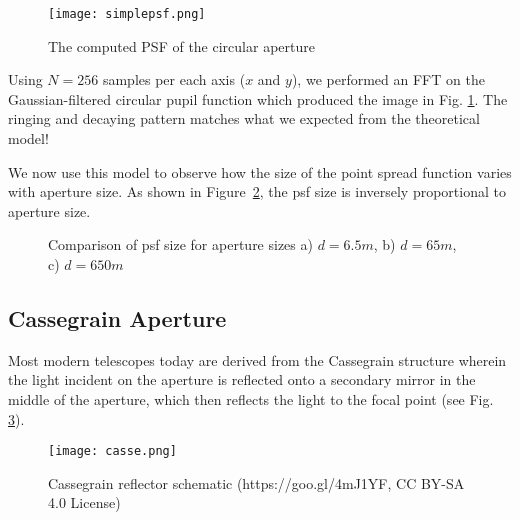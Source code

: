 \documentclass[%
 reprint,
 amsmath,amssymb,
 aps,
 pra,
]{revtex4-1}
\begin{document}
{\begin{figure}[!ht]
  \centering
    \texttt{[image: simplepsf.png]}
  \caption{The computed PSF of the circular aperture}
  \label{fig:simplepsf}
\end{figure}

Using $N=256$ samples per each axis ($x$ and $y$), we performed an FFT on the Gaussian-filtered circular pupil function which produced the image in Fig. \ref{fig:simplepsf}. The ringing and decaying pattern matches what we expected from the theoretical model!

We now use this model to observe how the size of the point spread function varies with aperture size. As shown in Figure~\ref{fig:psfcomp}, the psf size is inversely proportional to aperture size.
\begin{figure}[h!]
\begin{minipage}{.45\textwidth}
  \centering
\end{minipage}
\begin{minipage}{.45\textwidth}
  \centering
\end{minipage}

\begin{minipage}{\textwidth}
  \centering
\end{minipage}
\caption{Comparison of psf size for aperture sizes a) $d=6.5m$, b) $d=65m$, c) $d=650m$}
\label{fig:psfcomp}
\end{figure}


\subsection{Cassegrain Aperture} \label{subsec:cassegrain-aperture}

Most modern telescopes today are derived from the Cassegrain structure wherein the light incident on the aperture is reflected onto a secondary mirror in the middle of the aperture, which then reflects the light to the focal point (see Fig. \ref{fig:cassegrain-schem}).

\begin{figure}[!ht]
  \centering
  	\texttt{[image: casse.png]}
  \caption{Cassegrain reflector schematic (https://goo.gl/4mJ1YF, CC BY-SA 4.0 License)}
  \label{fig:cassegrain-schem}
\end{figure}

}
\end{document}
